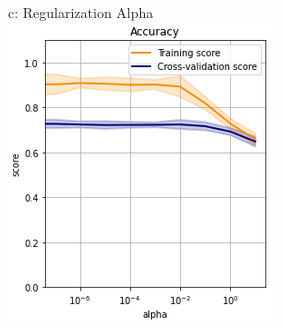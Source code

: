 \documentclass{article}
\begin{document}
\begin{figure}
\begin{subfigure}{.24\textwidth}
	\end{subfigure}
	\begin{subfigure}{.24\textwidth}
		\centering
		c: Regularization Alpha\\
		\includegraphics[width=\linewidth]{poland_nn_alpha_0_10_accuracy.png}
		

\end{subfigure}
\end{figure}
\end{document}
